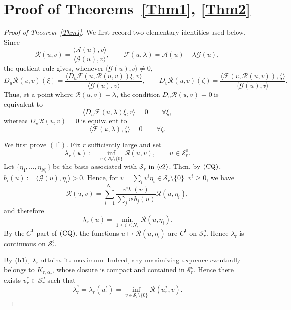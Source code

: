 \documentclass[preprint,10pt]{elsarticle}
\numberwithin{equation}{section}
\begin{document}


\section{Proof of Theorems~\ref{Thm1}, \ref{Thm2}}
\label{sec.13}

\begin{proof}[Proof of Theorem~\ref{Thm1}]
	We first record two elementary identities used below. Since
	\[
	\mathcal R(u,v)
	=
	\frac{\langle\mathcal A(u),v\rangle}
	{\langle\mathcal G(u),v\rangle},
	\qquad
	\mathcal F(u,\lambda)=\mathcal A(u)-\lambda\mathcal G(u),
	\]
	the quotient rule gives, whenever \(\langle\mathcal G(u),v\rangle\ne0\),
	\[
	D_u\mathcal R(u,v)(\xi)
	=
	\frac{
		\bigl\langle
		D_u\mathcal F(u,\mathcal R(u,v))\xi,v
		\bigr\rangle
	}{
		\langle\mathcal G(u),v\rangle
	},
	\qquad
	D_v\mathcal R(u,v)(\zeta)
	=
	\frac{
		\bigl\langle
		\mathcal F(u,\mathcal R(u,v)),\zeta
		\bigr\rangle
	}{
		\langle\mathcal G(u),v\rangle
	}.
	\]
	Thus, at a point where \(\mathcal R(u,v)=\lambda\), the condition
	\(D_u\mathcal R(u,v)=0\) is equivalent to
	\[
	\bigl\langle D_u\mathcal F(u,\lambda)\xi,v\bigr\rangle=0
	\qquad \forall \xi,
	\]
	whereas \(D_v\mathcal R(u,v)=0\) is equivalent to
	\[
	\bigl\langle \mathcal F(u,\lambda),\zeta\bigr\rangle=0
	\qquad \forall \zeta .
	\]
	
	We first prove \((1^\circ)\). Fix \(r\) sufficiently large and set
	\[
	\lambda_r(u):=
	\inf_{v\in\mathcal S_r\setminus\{0\}}\mathcal R(u,v),
	\qquad u\in\mathcal S_r^o .
	\]
	Let \(\{\eta_1,\ldots,\eta_{N_r}\}\) be the basis associated with
	\(\mathcal S_r\) in \({\rm (c2)}\). Then, by \({\rm (CQ)}\),
	\(b_i(u):=\langle\mathcal G(u),\eta_i\rangle>0\). Hence, for
	\(v=\sum_i v^i\eta_i\in\mathcal S_r\setminus\{0\}\), \(v^i\ge0\), we have
	\[
	\mathcal R(u,v)
	=
	\sum_{i=1}^{N_r}
	\frac{v^i b_i(u)}{\sum_j v^j b_j(u)}
	\mathcal R(u,\eta_i),
	\]
	and therefore
	\[
	\lambda_r(u)=\min_{1\le i\le N_r}\mathcal R(u,\eta_i).
	\]
	By the \(C^1\)-part of \({\rm (CQ)}\), the functions
	\(u\mapsto\mathcal R(u,\eta_i)\) are \(C^1\) on \(\mathcal S_r^o\).
	Hence \(\lambda_r\) is continuous on \(\mathcal S_r^o\).
	
	By \({\rm (h1)}\), \(\lambda_r\) attains its maximum. Indeed, any
	maximizing sequence eventually belongs to \(K_{r,\alpha_r}\), whose
	closure is compact and contained in \(\mathcal S_r^o\). Hence there exists
	\(u_r^*\in\mathcal S_r^o\) such that
	\[
	\lambda_r^*
	=
	\lambda_r(u_r^*)
	=
	\inf_{v\in\mathcal S_r\setminus\{0\}}\mathcal R(u_r^*,v).
	\]
	

\end{proof}
\end{document}
